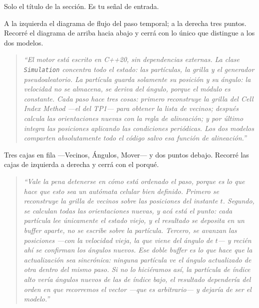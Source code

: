\documentclass[11pt]{article}
\begin{document}

Solo el título de la sección. Es tu señal de entrada.


A la izquierda el diagrama de flujo del paso temporal; a la derecha tres
puntos. Recorré el diagrama de arriba hacia abajo y cerrá con lo único que
distingue a los dos modelos.

\begin{quote}
\itshape
``El motor está escrito en C++20, sin dependencias externas. La clase
\texttt{Simulation} concentra todo el estado: las partículas, la grilla y el
generador pseudoaleatorio. La partícula guarda solamente su posición y su
ángulo: la velocidad no se almacena, se deriva del ángulo, porque el módulo es
constante. Cada paso hace tres cosas: primero reconstruye la grilla del Cell
Index Method ---el del TP1--- para obtener la lista de vecinos; después calcula
las orientaciones nuevas con la regla de alineación; y por último integra las
posiciones aplicando las condiciones periódicas. Los dos modelos comparten
absolutamente todo el código salvo esa función de alineación.''
\end{quote}




Tres cajas en fila ---Vecinos, Ángulos, Mover--- y dos puntos debajo. Recorré
las cajas de izquierda a derecha y cerrá con el porqué.

\begin{quote}
\itshape
``Vale la pena detenerse en cómo está ordenado el paso, porque es lo que hace
que esto sea un autómata celular bien definido. Primero se reconstruye la grilla
de vecinos sobre las posiciones del instante $t$. Segundo, se calculan todas las
orientaciones nuevas, y acá está el punto: cada partícula lee \emph{únicamente}
el estado viejo, y el resultado se deposita en un buffer aparte, no se escribe
sobre la partícula. Tercero, se avanzan las posiciones ---con la velocidad
vieja, la que viene del ángulo de $t$--- y recién ahí se confirman los ángulos
nuevos. Ese doble buffer es lo que hace que la actualización sea sincrónica:
ninguna partícula ve el ángulo actualizado de otra dentro del mismo paso. Si no
lo hiciéramos así, la partícula de índice alto vería ángulos nuevos de las de
índice bajo, el resultado dependería del orden en que recorremos el vector
---que es arbitrario--- y dejaría de ser el modelo.''
\end{quote}
\end{document}
